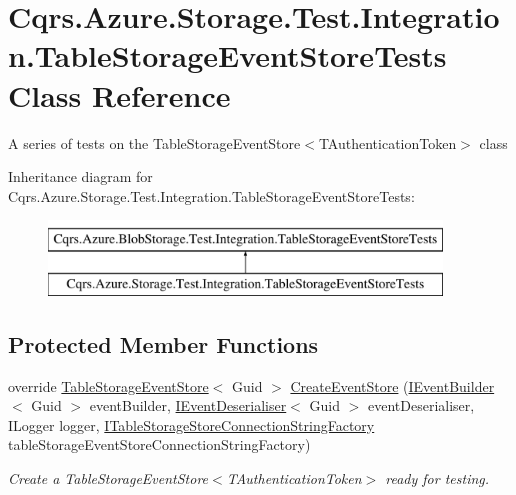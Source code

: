 \hypertarget{classCqrs_1_1Azure_1_1Storage_1_1Test_1_1Integration_1_1TableStorageEventStoreTests}{}\section{Cqrs.\+Azure.\+Storage.\+Test.\+Integration.\+Table\+Storage\+Event\+Store\+Tests Class Reference}
\label{classCqrs_1_1Azure_1_1Storage_1_1Test_1_1Integration_1_1TableStorageEventStoreTests}


A series of tests on the Table\+Storage\+Event\+Store$<$\+T\+Authentication\+Token$>$ class  


Inheritance diagram for Cqrs.\+Azure.\+Storage.\+Test.\+Integration.\+Table\+Storage\+Event\+Store\+Tests\+:\begin{figure}[H]
\begin{center}
\leavevmode
\includegraphics[height=2.000000cm]{classCqrs_1_1Azure_1_1Storage_1_1Test_1_1Integration_1_1TableStorageEventStoreTests}
\end{center}
\end{figure}
\subsection*{Protected Member Functions}
\begin{DoxyCompactItemize}
\item 
override \hyperlink{classCqrs_1_1Azure_1_1BlobStorage_1_1Events_1_1TableStorageEventStore}{Table\+Storage\+Event\+Store}$<$ Guid $>$ \hyperlink{classCqrs_1_1Azure_1_1Storage_1_1Test_1_1Integration_1_1TableStorageEventStoreTests_aa7c476f27ce9940048ac7abde7cfabcb_aa7c476f27ce9940048ac7abde7cfabcb}{Create\+Event\+Store} (\hyperlink{interfaceCqrs_1_1Events_1_1IEventBuilder}{I\+Event\+Builder}$<$ Guid $>$ event\+Builder, \hyperlink{interfaceCqrs_1_1Events_1_1IEventDeserialiser}{I\+Event\+Deserialiser}$<$ Guid $>$ event\+Deserialiser, I\+Logger logger, \hyperlink{interfaceCqrs_1_1Azure_1_1BlobStorage_1_1ITableStorageStoreConnectionStringFactory}{I\+Table\+Storage\+Store\+Connection\+String\+Factory} table\+Storage\+Event\+Store\+Connection\+String\+Factory)
\begin{DoxyCompactList}\small\item\em Create a Table\+Storage\+Event\+Store$<$\+T\+Authentication\+Token$>$ ready for testing. \end{DoxyCompactList}\end{DoxyCompactItemize}
